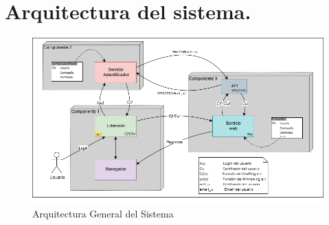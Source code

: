 \documentclass[12pt, a4paper, titlepage]{report}
\begin{document}
    	    
    	\section{Arquitectura del sistema.}
            \begin{figure}[H]
        		\begin{center}
        		\includegraphics[width=15cm]{./imagenes/Analisis/ArquitecturaSistema.png}
        		\caption{Arquitectura General del Sistema}
	            \end{center}
	        \end{figure}    	
    	
\end{document}
